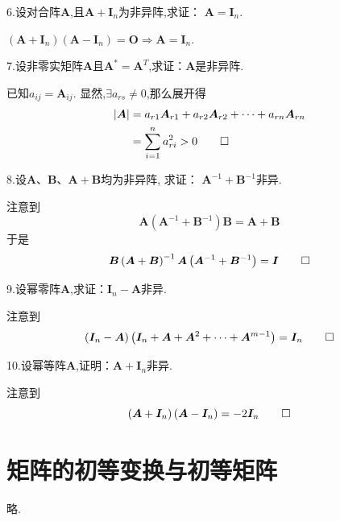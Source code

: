 6.设对合阵$\bm{A}$,且$\bm{A}+\bm{I}_n$为非异阵,求证：
$\bm{A}=\bm{I}_n.$
\begin{Proof}
$\left(\bm{A}+\bm{I}_n\right)\left(\bm{A}-\bm{I}_n\right)=\bm{O}\Longrightarrow
\bm{A}=\bm{I}_n.$
\end{Proof}

7.设非零实矩阵$\bm{A}$且$\bm{A}^*=\bm{A}^T$,求证：$\bm{A}$是非异阵.
\begin{Proof}
	已知$a_{ij}=\bm{A}_{ij}$.
显然,$\exists a_{rs}\neq 0$,那么展开得
\begin{align*}
	\left|\bm{A}\right|&=a_{r1}\bm{A}_{r1}+a_{r2}\bm{A}_{r2}+\cdots+a_{rn}\bm{A}_{rn}
\\
&=\sum_{i=1}^{n}a_{ri}^2
	>0
	\qedhere
\end{align*}
\end{Proof}

8.设$\bm{A}$、$\bm{B}$、$\bm{A}+\bm{B}$均为非异阵,
求证：
$\bm{A}^{-1}+\bm{B}^{-1}$非异.
\begin{Proof}
注意到
\[
\bm{A}\left(\bm{A}^{-1}+\bm{B}^{-1}\right)\bm{B}=\bm{A}+\bm{B}
\]
于是
\[
\bm{B}\left(\bm{A}+\bm{B}\right)^{-1}\bm{A}\left(\bm{A}^{-1}+\bm{B}^{-1}\right)=\bm{I}
\qedhere
\]
\end{Proof}

9.设幂零阵$\bm{A}$,求证：$\bm{I}_n-\bm{A}$非异.
\begin{Proof}
注意到
\[
\left(\bm{I}_n-\bm{A}\right)\left(
	\bm{I}_n+\bm{A}+\bm{A}^2+\cdots+\bm{A}^{m-1}\right)=\bm{I}_n
\qedhere
\]
\end{Proof}

10.设幂等阵$\bm{A}$,证明：$\bm{A}+\bm{I}_n$非异.
\begin{Proof}
注意到
\[
\left(\bm{A}+\bm{I}_n\right)\left(\bm{A}-\bm{I}_n\right)=-2\bm{I}_n
\qedhere
\]
\end{Proof}
\section{矩阵的初等变换与初等矩阵}
略.
